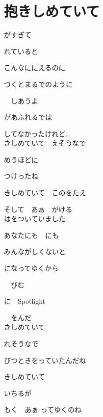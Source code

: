\section{ 抱きしめていて}
\large{

がすぎて

れていると

こんなににえるのに

づくとまるでのように

　しあうよ

があふれるでは

してなかったけれど…
\\

きしめていて　えそうなで

めうほどに

つけったね

きしめていて　このをたえ

そして　あぁ　がける
\\

はをついていました

あなたにも　にも

みんながしくないと

になってゆくから

　びむ

に　Spotlight

　をんだ
\\

きしめていて

れそうなで

びつときをっていたんだね

きしめていて

いちるが

もく　あぁ ってゆくのね
\\

}
